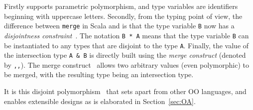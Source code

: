 \noindent Firstly \name supports parametric polymorphism, and type variables are
identifiers beginning with uppercase letters. Secondly, from the typing point of
view, the difference between \lstinline{merge} in Scala and \name is that the
type variable \lstinline{B} now has a \emph{disjointness
  constraint}~\cite{alpuimdisjoint}. The notation \lstinline{B * A} means that
the type variable \lstinline{B} can be instantiated to any types that are
disjoint to the type \lstinline{A}. Finally, the value of the intersection type
\lstinline{A & B} is directly built using the \textit{merge construct} (denoted
by \lstinline{,,}). The merge construct~\cite{dunfield2014elaborating} allows
two arbitrary values (even polymorphic) to be merged, with the resulting type
being an intersection type.

It is this disjoint polymorphism~\cite{alpuimdisjoint} that sets apart \name
from other OO languages, and enables extensible designs as is elaborated in
Section~\ref{sec:OA}.

